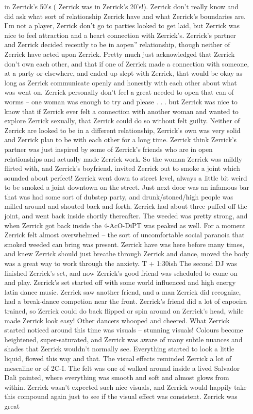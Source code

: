 \documentclass[12pt]{book}
\begin{document}
in Zerrick's 50's ( Zerrick was in Zerrick's 20's!). Zerrick don't really know and did ask what sort of relationship Zerrick have and what Zerrick's boundaries are. I'm not a player, Zerrick don't go to parties looked to get laid, but Zerrick was nice to feel attraction and a heart connection with Zerrick's. Zerrick's partner and Zerrick decided recently to be in aopen'' relationship, though neither of Zerrick have acted upon Zerrick. Pretty much just acknowledged that Zerrick don't own each other, and that if one of Zerrick made a connection with someone, at a party or elsewhere, and ended up slept with Zerrick, that would be okay as long as Zerrick communicate openly and honestly with each other about what was went on. Zerrick personally don't feel a great needed to open that can of worms -- one woman was enough to try and please . . .  but Zerrick was nice to know that if Zerrick ever felt a connection with another woman and wanted to explore Zerrick sexually, that Zerrick could do so without felt guilty. Neither of Zerrick are looked to be in a different relationship, Zerrick's own was very solid and Zerrick plan to be with each other for a long time. Zerrick think Zerrick's partner was just inspired by some of Zerrick's friends who are in open relationships and actually made Zerrick work. So the woman Zerrick was mildly flirted with, and Zerrick's boyfriend, invited Zerrick out to smoke a joint which sounded about perfect! Zerrick went down to street level, always a little bit weird to be smoked a joint downtown on the street. Just next door was an infamous bar that was had some sort of dubstep party, and drunk/stoned/high people was milled around and shouted back and forth. Zerrick had about three puffed off the joint, and went back inside shortly thereafter. The weeded was pretty strong, and when Zerrick got back inside the 4-AcO-DiPT was peaked as well. For a moment Zerrick felt almost overwhelmed -- the sort of uncomfortable social paranoia that smoked weeded can bring was present. Zerrick have was here before many times, and knew Zerrick should just breathe through Zerrick and dance, moved the body was a great way to work through the anxiety. T + 1:30ish The second DJ was finished Zerrick's set, and now Zerrick's good friend was scheduled to come on and play. Zerrick's set started off with some world influenced and high energy latin dance music. Zerrick saw another friend, and a man Zerrick did recognize, had a break-dance competion near the front. Zerrick's friend did a lot of capoeira trained, so Zerrick could do back flipped or spin around on Zerrick's head, while made Zerrick look easy! Other dancers whooped and cheered. What Zerrick started noticed around this time was visuals -- stunning visuals! Colours become heightened, super-saturated, and Zerrick was aware of many subtle nuances and shades that Zerrick wouldn't normally see. Everything started to look a little liquid, flowed this way and that. The visual effects reminded Zerrick a lot of mescaline or of 2C-I. The felt was one of walked around inside a lived Salvador Dali painted, where everything was smooth and soft and almost glows from within. Zerrick wasn't expected such nice visuals, and Zerrick would happily take this compound again just to see if the visual effect was consistent. Zerrick was great 
\end{document}
